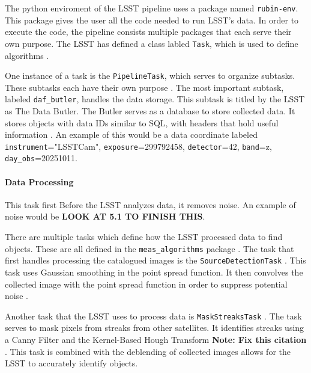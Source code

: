 \documentclass[preprint,linenumbers, longauthor]{aastex631}
\begin{document}
The python enviroment of the LSST pipeline uses a package named \texttt{rubin-env}. This package gives the user all the code needed to run LSST's data. 
In order to execute the code, the pipeline consists multiple packages that each serve their own purpose. 
The LSST has defined a class labled \texttt{Task}, which is used to define algorithms \citep{nsf-doeverac.rubinobservatoryPSTN019LSSTScience2025}.

One instance of a task is the \texttt{PipelineTask}, which serves to organize subtasks. These subtasks each have their own purpose \citep{nsf-doeverac.rubinobservatoryPSTN019LSSTScience2025}. 
The most important subtask, labeled \texttt{daf\_butler}, handles the data storage. This subtask is titled by the LSST as The Data Butler. The Butler serves as a database to store collected data. It stores objects with data IDs similar to SQL, with headers that hold useful information \citep{nsf-doeverac.rubinobservatoryPSTN019LSSTScience2025}.
An example of this would be a data coordinate labeled \texttt{instrument}="LSSTCam", \texttt{exposure}=299792458, \texttt{detector}=42, \texttt{band}=z, \texttt{day\_obs}=20251011.



\paragraph{Data Processing} 
This task first Before the LSST analyzes data, it removes noise. An example of noise would be \textbf{LOOK AT 5.1 TO FINISH THIS}.

There are multiple tasks which define how the LSST processed data to find objects. These are all defined in the \texttt{meas\_algorithms} package \citep{nsf-doeverac.rubinobservatoryPSTN019LSSTScience2025}.
The task that first handles processing the catalogued images is the \texttt{SourceDetectionTask} \citep{nsf-doeverac.rubinobservatoryPSTN019LSSTScience2025}. 
This task uses Gaussian smoothing in the point spread function. It then convolves the collected image with the point spread function in order to suppress potential noise \citep{nsf-doeverac.rubinobservatoryPSTN019LSSTScience2025}.

Another task that the LSST uses to process data is \texttt{MaskStreaksTask} \citep{nsf-doeverac.rubinobservatoryPSTN019LSSTScience2025}. The task serves to mask pixels from streaks from other satellites. It identifies streaks using a Canny Filter and the Kernel-Based Hough Transform \textbf{Note: Fix this citation } \citep{nsf-doeverac.rubinobservatoryPSTN019LSSTScience2025}.
This task is combined with the deblending of collected images allows for the LSST to accurately identify objects.
\end{document}
